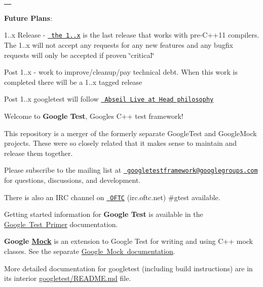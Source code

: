\href{https://travis-ci.org/google/googletest}{\texttt{ }} \href{https://ci.appveyor.com/project/GoogleTestAppVeyor/googletest/branch/master}{\texttt{ }}

{\bfseries{Future Plans}}\+:
\begin{DoxyItemize}
\item 1..\+x Release -\/ \href{https://github.com/google/googletest/releases/tag/release-1.8.1}{\texttt{ the 1..\+x}} is the last release that works with pre-\/\+C++11 compilers. The 1..\+x will not accept any requests for any new features and any bugfix requests will only be accepted if proven \char`\"{}critical\char`\"{}
\item Post 1..\+x -\/ work to improve/cleanup/pay technical debt. When this work is completed there will be a 1..\+x tagged release
\item Post 1..\+x googletest will follow \href{https://abseil.io/about/philosophy}{\texttt{ Abseil Live at Head philosophy}}
\end{DoxyItemize}

Welcome to {\bfseries{Google Test}}, Google\textquotesingle{}s C++ test framework!

This repository is a merger of the formerly separate Google\+Test and Google\+Mock projects. These were so closely related that it makes sense to maintain and release them together.

Please subscribe to the mailing list at \href{mailto:googletestframework@googlegroups.com}{\texttt{ googletestframework@googlegroups.\+com}} for questions, discussions, and development.

There is also an I\+RC channel on \href{https://webchat.oftc.net/}{\texttt{ O\+F\+TC}} (irc.\+oftc.\+net) \#gtest available.

Getting started information for {\bfseries{Google Test}} is available in the \mbox{\hyperlink{_obj__test_2lib_2googletest-release-1_88_81_2googletest_2docs_2primer_8md}{Google Test Primer}} documentation.

{\bfseries{Google \mbox{\hyperlink{class_mock}{Mock}}}} is an extension to Google Test for writing and using C++ mock classes. See the separate \mbox{\hyperlink{_obj__test_2lib_2googletest-release-1_88_81_2googlemock_2_r_e_a_d_m_e_8md}{Google Mock documentation}}.

More detailed documentation for googletest (including build instructions) are in its interior \mbox{\hyperlink{_obj__test_2lib_2googletest-release-1_88_81_2googletest_2_r_e_a_d_m_e_8md}{googletest/\+R\+E\+A\+D\+ME.md}} file.

